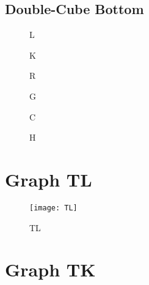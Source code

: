 \documentclass[a4paper,10pt]{article}
\begin{document}
\begin{landscape}
\section{Double-Cube Bottom}

\begin{figure}[ht]
\begin{minipage}[b]{0.33\linewidth}
\centering
   \fbox{\texttt{[image: L]}}
\caption{L}
\label{fig:figure1}
\end{minipage}
\hspace{0.5cm}
\begin{minipage}[b]{0.33\linewidth}
\centering
   \fbox{\texttt{[image: K]}}
\caption{K}
\label{fig:figure2}
\end{minipage}
\begin{minipage}[b]{0.33\linewidth}
\centering
   \fbox{\texttt{[image: R]}}
\caption{R}
\label{fig:figure1}
\end{minipage}
\begin{minipage}[b]{0.33\linewidth}
\centering
   \fbox{\texttt{[image: G]}}
\caption{G}
\label{fig:figure1}
\end{minipage}
\hspace{0.5cm}
\begin{minipage}[b]{0.33\linewidth}
\centering
   \fbox{\texttt{[image: C]}}
\caption{C}
\label{fig:figure2}
\end{minipage}
\begin{minipage}[b]{0.33\linewidth}
\centering
   \fbox{\texttt{[image: H]}}
\caption{H}
\label{fig:figure1}
\end{minipage}
\end{figure}

\end{landscape}


\section{Graph TL}

\begin{figure}[h!]
  \centering
    \texttt{[image: TL]}
  \caption{TL}
\end{figure}

\section{Graph TK}
\end{document}
